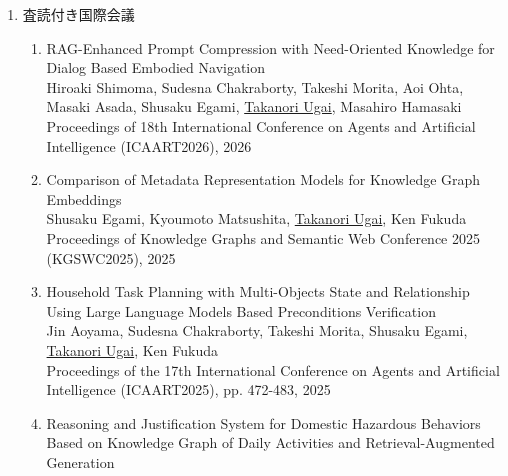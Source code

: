 \documentclass[dvipdfmx]{jlreq}
\begin{document}
\begin{enumerate}
\begin{enumerate}
\begin{enumerate}
人工知能学会論文誌, 第39巻 第6号, p. C-O42\_1, 2024
\item Constructing and Evaluating a Japanese Entity Linking Model for Wikidata based on Pointer Network\\
Yuki Sawamura, Takeshi Morita, Shusaku Egami, \underline{Takanori Ugai}, Ken Fukuda\\
Transactions of the Japanese Society for Artificial Intelligence, vol. 39, no. 6, p. C-O42\_1, 2024
\item 属性つきゴールグラフにおけるゴールの品質特性\\
\underline{鵜飼孝典}, 林晋平, 佐伯元司\\
情報処理学会論文誌, 第55巻 第2号, pp893－908, 2014
\item 要求獲得におけるステークホルダの偏りと不足を検出する可視化ツール\\
\underline{鵜飼孝典}, 林晋平, 佐伯元司\\
情報処理学会論文誌, 第53巻 第4号, pp1448－1460, 2012
\end{enumerate}
\item 査読付き国際会議
\begin{enumerate}[label=\arabic*,align=right, labelsep=3pt]
\item RAG-Enhanced Prompt Compression with Need-Oriented Knowledge for Dialog Based Embodied Navigation\\
Hiroaki Shimoma, Sudesna Chakraborty, Takeshi Morita, Aoi Ohta, Masaki Asada, Shusaku Egami, \underline{Takanori Ugai}, Masahiro Hamasaki\\
Proceedings of 18th International Conference on Agents and Artificial Intelligence (ICAART2026), 2026
\item Comparison of Metadata Representation Models for Knowledge Graph Embeddings\\
Shusaku Egami, Kyoumoto Matsushita, \underline{Takanori Ugai}, Ken Fukuda\\
Proceedings of Knowledge Graphs and Semantic Web Conference 2025 (KGSWC2025), 2025
\item Household Task Planning with Multi-Objects State and Relationship Using Large Language Models Based Preconditions Verification\\
Jin Aoyama, Sudesna Chakraborty, Takeshi Morita, Shusaku Egami, \underline{Takanori Ugai}, Ken Fukuda\\
Proceedings of the 17th International Conference on Agents and Artificial Intelligence (ICAART2025), pp. 472-483, 2025
\item Reasoning and Justification System for Domestic Hazardous Behaviors Based on Knowledge Graph of Daily Activities and Retrieval-Augmented Generation\\

\end{enumerate}
\end{enumerate}
\end{enumerate}
\end{document}
